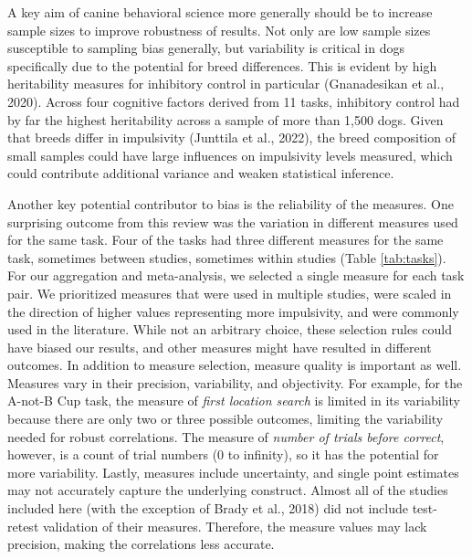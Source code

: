 \documentclass[
  ,pub,floatsintext]{apa6}
\begin{document}


A key aim of canine behavioral science more generally should be to increase sample sizes to improve robustness of results. Not only are low sample sizes susceptible to sampling bias generally, but variability is critical in dogs specifically due to the potential for breed differences. This is evident by high heritability measures for inhibitory control in particular (Gnanadesikan et al., 2020). Across four cognitive factors derived from 11 tasks, inhibitory control had by far the highest heritability across a sample of more than 1,500 dogs. Given that breeds differ in impulsivity (Junttila et al., 2022), the breed composition of small samples could have large influences on impulsivity levels measured, which could contribute additional variance and weaken statistical inference.


Another key potential contributor to bias is the reliability of the measures. One surprising outcome from this review was the variation in different measures used for the same task. Four of the tasks had three different measures for the same task, sometimes between studies, sometimes within studies (Table \ref{tab:tasks}). For our aggregation and meta-analysis, we selected a single measure for each task pair. We prioritized measures that were used in multiple studies, were scaled in the direction of higher values representing more impulsivity, and were commonly used in the literature. While not an arbitrary choice, these selection rules could have biased our results, and other measures might have resulted in different outcomes. In addition to measure selection, measure quality is important as well. Measures vary in their precision, variability, and objectivity. For example, for the A-not-B Cup task, the measure of \emph{first location search} is limited in its variability because there are only two or three possible outcomes, limiting the variability needed for robust correlations. The measure of \emph{number of trials before correct}, however, is a count of trial numbers (0 to infinity), so it has the potential for more variability. Lastly, measures include uncertainty, and single point estimates may not accurately capture the underlying construct. Almost all of the studies included here (with the exception of Brady et al., 2018) did not include test-retest validation of their measures. Therefore, the measure values may lack precision, making the correlations less accurate.
\end{document}
